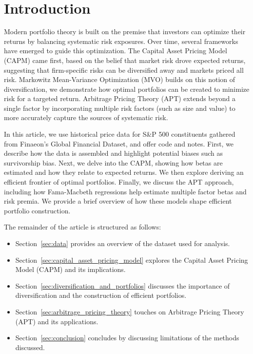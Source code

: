 \section{Introduction}
\label{sec:introduction}
Modern portfolio theory is built on the premise that investors can optimize their returns by balancing systematic risk exposures.
Over time, several frameworks have emerged to guide this optimization.
The Capital Asset Pricing Model (CAPM) came first, based on the belief that market risk drove expected returns, 
suggesting that firm-specific risks can be diversified away and markets priced all risk. 
Markowitz Mean-Variance Optimization (MVO) builds on this notion of diversification,
we demonstrate how optimal portfolios can be created to minimize risk for a targeted return.
Arbitrage Pricing Theory (APT) extends beyond a single factor by incorporating multiple risk factors (such as size and value)
to more accurately capture the sources of systematic risk.

In this article, we use historical price data for S\&P 500 constituents gathered from Finaeon's Global Financial Dataset, and offer code and notes.
First, we describe how the data is assembled and highlight potential biases such as survivorship bias.
Next, we delve into the CAPM, showing how betas are estimated and how they relate to expected returns.
We then explore deriving an efficient frontier of optimal portfolios.
Finally, we discuss the APT approach, including how Fama-Macbeth regressions help estimate multiple factor betas and risk premia.
We provide a brief overview of how these models shape efficient portfolio construction.

The remainder of the article is structured as follows:
\begin{itemize}
    \item Section~\ref{sec:data} provides an overview of the dataset used for analysis.
    \item Section~\ref{sec:capital_asset_pricing_model} explores the Capital Asset Pricing Model (CAPM) and its implications.
    \item Section~\ref{sec:diversification_and_portfolios} discusses the importance of diversification and the construction of efficient portfolios.
    \item Section~\ref{sec:arbitrage_pricing_theory} touches on Arbitrage Pricing Theory (APT) and its applications.
    \item Section~\ref{sec:conclusion} concludes by discussing limitations of the methods discussed.
\end{itemize}